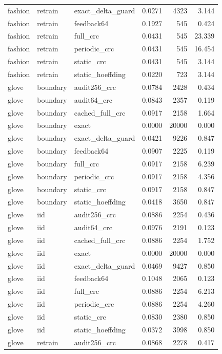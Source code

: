 \begin{tabular}{lllrrr}
fashion & retrain & exact\_delta\_guard & 0.0271 & 4323 & 3.144 \\
fashion & retrain & feedback64 & 0.1927 & 545 & 0.424 \\
fashion & retrain & full\_crc & 0.0431 & 545 & 23.339 \\
fashion & retrain & periodic\_crc & 0.0431 & 545 & 16.454 \\
fashion & retrain & static\_crc & 0.0431 & 545 & 3.144 \\
fashion & retrain & static\_hoeffding & 0.0220 & 723 & 3.144 \\
glove & boundary & audit256\_crc & 0.0784 & 2428 & 0.434 \\
glove & boundary & audit64\_crc & 0.0843 & 2357 & 0.119 \\
glove & boundary & cached\_full\_crc & 0.0917 & 2158 & 1.664 \\
glove & boundary & exact & 0.0000 & 20000 & 0.000 \\
glove & boundary & exact\_delta\_guard & 0.0421 & 9226 & 0.847 \\
glove & boundary & feedback64 & 0.0907 & 2225 & 0.119 \\
glove & boundary & full\_crc & 0.0917 & 2158 & 6.239 \\
glove & boundary & periodic\_crc & 0.0917 & 2158 & 4.356 \\
glove & boundary & static\_crc & 0.0917 & 2158 & 0.847 \\
glove & boundary & static\_hoeffding & 0.0418 & 3650 & 0.847 \\
glove & iid & audit256\_crc & 0.0886 & 2254 & 0.436 \\
glove & iid & audit64\_crc & 0.0976 & 2191 & 0.123 \\
glove & iid & cached\_full\_crc & 0.0886 & 2254 & 1.752 \\
glove & iid & exact & 0.0000 & 20000 & 0.000 \\
glove & iid & exact\_delta\_guard & 0.0469 & 9427 & 0.850 \\
glove & iid & feedback64 & 0.1048 & 2065 & 0.123 \\
glove & iid & full\_crc & 0.0886 & 2254 & 6.213 \\
glove & iid & periodic\_crc & 0.0886 & 2254 & 4.260 \\
glove & iid & static\_crc & 0.0830 & 2380 & 0.850 \\
glove & iid & static\_hoeffding & 0.0372 & 3998 & 0.850 \\
glove & retrain & audit256\_crc & 0.0868 & 2278 & 0.417 \\

\end{tabular}
